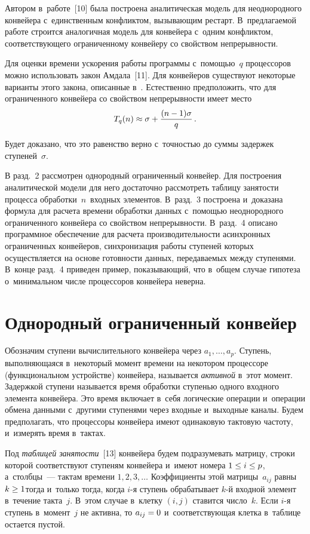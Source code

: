 \begin{multicols}{2}
Автором в~работе~[10] была 
построена аналитическая модель для неоднородного конвейера 
с~единственным конфликтом, вызывающим ре\-старт. В~предлагаемой 
работе строится аналогичная модель для конвейера с~одним конфликтом, 
соответствующего ограниченному конвейеру со свойством непрерывности. 
  
  Для оценки времени ускорения работы программы с~помощью~$q$ 
процессоров можно использовать закон Амдала~[11]. Для конвейеров 
существуют некоторые варианты этого закона, описанные 
в~\cite[п.~1.4.1.3]{12-h}. Естественно предположить, что для ограниченного 
конвейера со свойством непрерывности имеет место 
$$
T_q(n)\approx 
\sigma+ \displaystyle\frac{\displaystyle (n-1)\sigma\mathstrut}{\displaystyle q\mathstrut}\,.
$$

 Будет доказано, что это равенство верно 
с~точностью до суммы задержек ступеней~$\sigma$. 
  
  В разд.~2 рассмотрен однородный ограниченный конвейер. Для 
построения аналитической модели для него достаточно рассмотреть 
таблицу занятости процесса обработки~$n$~входных элементов. В~разд.~3 
построена и~доказана формула для расчета времени обработки данных 
с~помощью неоднородного ограниченного конвейера со свойством 
непрерывности. В~разд.~4 описано программное обеспечение для расчета 
производительности асинхронных ограниченных конвейеров, 
синхронизация работы ступеней которых осуществляется на основе 
готовности данных, передаваемых между ступенями. В~конце разд.~4 
приведен пример, показывающий, что в~общем случае гипотеза 
о~минимальном числе процессоров конвейера неверна. 
     
\section{Однородный ограниченный конвейер}

  Обозначим ступени вычислительного конвейера через $a_1,\ldots , a_p$. 
Ступень, выполняющаяся в~некоторый момент времени на некотором 
процессоре (функциональном устройстве) конвейера, называется 
\textit{активной} в~этот момент. Задержкой ступени называется время 
обработки ступенью одного входного элемента конвейера. Это время 
включает в~себя логические операции и~операции обмена данными 
с~другими ступенями через входные и~выходные каналы. Будем 
предполагать, что процессоры конвейера имеют одинаковую тактовую 
частоту, и~измерять время в~тактах.
  
  Под \textit{таблицей занятости}~[13] конвейера будем подразумевать 
матрицу, строки которой соответствуют ступеням конвейера и~имеют 
номера $1\hm\leq i\hm\leq p$, а~столбцы~--- тактам времени $1, 2, 3,\ldots$ 
Коэффициенты этой матрицы~$a_{ij}$ равны $k\hm\geq1$\linebreak тогда и~только 
тогда, когда $i$-я ступень обрабатывает $k$-й входной элемент в~течение 
такта~$j$. В~этом случае в~клетку $(i,j)$ ставится чис\-ло~$k$. Если $i$-я 
ступень в~момент~$j$ не активна, то $a_{ij}\hm=0$ и~со\-от\-вет\-ст\-ву\-ющая 
клетка в~таблице остается пустой.
  

\end{multicols}
